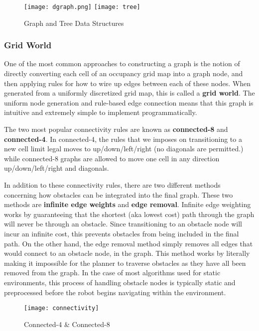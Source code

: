\begin{figure}[h]
  \texttt{[image: dgraph.png]}
  \texttt{[image: tree]}
  \centering
  \label{fig:graph}
  \caption{Graph and Tree Data Structures}
\end{figure}

\subsubsection{Grid World}
One of the most common approaches to constructing a graph is the notion of directly converting each cell of an occupancy grid map into a graph node, and then applying rules for how to wire up edges between each of these nodes. When generated from a uniformly discretized grid map, this is called a \textbf{grid world}. The uniform node generation and rule-based edge connection means that this graph is intuitive and extremely simple to implement programmatically.

The two most popular connectivity rules are known as \textbf{connected-8} and \textbf{connected-4}. In connected-4, the rules that we imposes on transitioning to a new cell limit legal moves to up/down/left/right (no diagonals are permitted.) while connected-8 graphs are allowed to move one cell in any direction up/down/left/right and diagonals. 

In addition to these connectivity rules, there are two different methods concerning how obstacles can be integrated into the final graph. These two methods are \textbf{infinite edge weights} and \textbf{edge removal}. Infinite edge weighting works by guaranteeing that the shortest (aka lowest cost) path through the graph will never be through an obstacle. Since transitioning to an obstacle node will incur an infinite cost, this prevents obstacles from being included in the final path. On the other hand, the edge removal method simply removes all edges that would connect to an obstacle node, in the graph. This method works by literally making it impossible for the planner to traverse obstacles as they have all been removed from the graph. In the case of most algorithms used for static environments, this process of handling obstacle nodes is typically static and preprocessed before the robot begins navigating within the environment.

\begin{figure}[t]
  \texttt{[image: connectivity]}
  \centering
  \label{fig:connectivity}
  \caption{Connected-4 \& Connected-8}
\end{figure}

